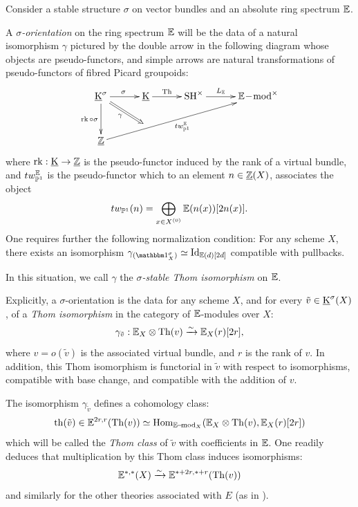 \begin{df}\label{df:sigma-orientation}
Consider a stable structure $\sigma$ on vector bundles
and an absolute ring spectrum $\mathbb E$.

A \emph{$\sigma$-orientation} on the ring spectrum $\mathbb E$ will be the data of a natural isomorphism
$\gamma$ 
pictured by the double arrow in the following diagram 
whose objects are pseudo-functors,
and simple arrows are natural transformations of pseudo-functors of fibred Picard groupoids:
$$
\xymatrix@R=6pt@C=30pt{
\uK^\sigma\ar^\sigma[r]\ar_{\rk \circ \sigma}[ddd]\ar@{=>}_{\gamma}[rdd]
& \uK\ar^-{\Th}[r]
& \SH^\times\ar^-{L_\E}[r]
&  \E\modd^\times \\
&&& \\
&&& \\
\uZ\ar_{tw^\E_{\PP^1}}[rrruuu] &&&
}
$$
where $\operatorname{rk}:\operatorname{\underline K} \rightarrow \operatorname{\underline {\mathbb{Z}}}$ is the pseudo-functor induced by the rank of a virtual bundle,
and $tw^\mathbb E_{\mathbb P^1}$ is the pseudo-functor which to an element $n \in \operatorname{\underline {\mathbb{Z}}}(X)$, associates
the object
$$
tw_{\mathbb P^1}(n)=\bigoplus_{x \in X^{(0)}} \mathbb E(n(x))[2n(x)].
$$
One requires further the following normalization condition:
For any scheme $X$, there exists an isomorphism
$\gamma_{(\un^\sigma_X)} \simeq \Id_{\E(d)[2d]}$ compatible with pullbacks.

In this situation, we call $\gamma$ the \emph{$\sigma$-stable Thom isomorphism} on $\mathbb E$.
\end{df}


\begin{num}\label{num:Thom_iso_explicit}
Explicitly, a $\sigma$-orientation is the data for any scheme $X$,
and for every $\tilde v \in \operatorname{\underline K}^\sigma(X)$, of a \emph{Thom isomorphism} in the
category of $\mathbb E$-modules over $X$:
\begin{equation}\label{eq:sigma_Thom_iso_map}
\gamma_{\tilde v}:\mathbb E_X \otimes \operatorname{Th}(v) \xrightarrow{\sim} \mathbb E_X(r)[2r],
\end{equation}
where $v=o(\tilde v)$ is the associated virtual bundle, and $r$ is the rank of $v$.
In addition, this Thom isomorphism is functorial in $\tilde v$ with respect to isomorphisms,
compatible with base change, and compatible with the addition of $v$.

The isomorphism $\gamma_{\tilde v}$ defines a cohomology class:
\begin{equation}\label{eq:sigma-Thom_class}
\operatorname{th}(\tilde v) \in \mathbb E^{2r,r}(\operatorname{Th}(v)) \simeq \operatorname{Hom}_{\mathbb E\!-\!\operatorname{mod}_X}(\mathbb E_X \otimes \operatorname{Th}(v),\mathbb E_X(r)[2r])
\end{equation}
which will be called the \emph{Thom class} of $\tilde v$ with coefficients in $\mathbb E$.
 One readily deduces that multiplication by this Thom class induces isomorphisms:
$$
\mathbb E^{*,*}(X) \xrightarrow{\sim} \mathbb E^{*+2r,*+r}(\operatorname{Th}(v))
$$
and similarly for the other theories associated with $E$ (as in ).
\end{num}


